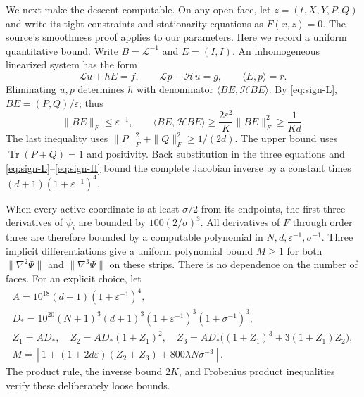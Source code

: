 We next make the descent computable.  On any open face, let
$z=(t,X,Y,P,Q)$ and write its tight constraints and stationarity
equations as $F(x,z)=0$.  The source's smoothness proof
\cite[Section~4.1]{EzeunalaJiang2026} applies to our parameters.
Here we record a uniform quantitative bound.
Write $B=\mathcal L^{-1}$ and $E=(I,I)$.  An inhomogeneous
linearized system has the form
\[
 \mathcal Lu+hE=f,\qquad
 \mathcal Lp-\mathcal Hu=g,\qquad \langle E,p\rangle=r.
\]
Eliminating $u,p$ determines $h$ with denominator
$\langle BE,\mathcal HBE\rangle$.
By \eqref{eq:sign-L}, $BE=(P,Q)/\varepsilon$; thus
\[
 \|BE\|_F\le\varepsilon^{-1},\qquad
 \langle BE,\mathcal HBE\rangle
 \ge\frac{2\varepsilon^2}{K}\|BE\|_F^2
 \ge\frac1{Kd}.
\]
The last inequality uses
$\|P\|_F^2+\|Q\|_F^2\ge1/(2d)$.
The upper bound uses $\operatorname{Tr}(P+Q)=1$ and positivity.
Back substitution in the three equations and
\eqref{eq:sign-L}--\eqref{eq:sign-H} bound the complete Jacobian
inverse by a constant times $(d+1)(1+\varepsilon^{-1})^4$.

When every active coordinate is at least $\sigma/2$ from its endpoints,
the first three derivatives of $\psi_i$ are bounded by
$100(2/\sigma)^3$.  All derivatives of $F$ through order three are
therefore bounded by a computable polynomial in
$N,d,\varepsilon^{-1},\sigma^{-1}$.
Three implicit differentiations give a uniform polynomial bound $M\ge1$
for both $\|\nabla^2\Psi\|$ and $\|\nabla^3\Psi\|$ on these strips.
There is no dependence on the number of faces.  For an explicit
choice, let
\begin{gather*}
 A=10^{18}(d+1)(1+\varepsilon^{-1})^4,\\
 D_*=10^{20}(N+1)^3(d+1)^3
             (1+\varepsilon^{-1})^3(1+\sigma^{-1})^3,\\
 Z_1=AD_*,\quad Z_2=AD_*(1+Z_1)^2,\quad
 Z_3=AD_*\bigl((1+Z_1)^3+3(1+Z_1)Z_2\bigr),\\
 M=\left\lceil1+(1+2d\varepsilon)(Z_2+Z_3)
                         +800\lambda N\sigma^{-3}\right\rceil.
\end{gather*}
The product rule, the inverse bound $2K$, and Frobenius product
inequalities verify these deliberately loose bounds.

